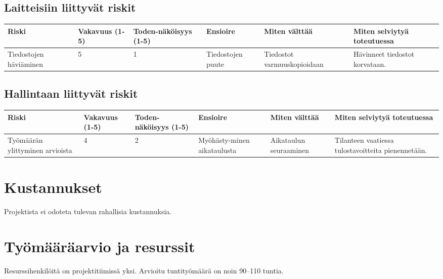 \documentclass[a4paper, 12pt, finnish]{article}
\begin{document}
\subsection{Laitteisiin liittyvät riskit}
\begin{table}[!htpb]
\begin{tabularx}{1.1\textwidth}{|X|X|X|X|X|X|}
\hline
\rowcolor[HTML]{EFEFEF}
\textbf{Riski} & \textbf{Vakavuus (1-5)} & \textbf{Toden-näköisyys (1-5)} & \textbf{Ensioire} & \textbf{Miten välttää} & \textbf{Miten selviytyä toteutuessa} \\ \hline
Tiedostojen häviäminen & 5 & 1 & Tiedostojen puute & Tiedostot varmuuskopioidaan & Hävinneet tiedostot korvataan. \\ \hline
\end{tabularx}
\end{table}

\subsection{Hallintaan liittyvät riskit}
\begin{table}[!htpb]
\begin{tabularx}{1.1\textwidth}{|X|X|X|X|X|X|}
\hline
\rowcolor[HTML]{EFEFEF}
\textbf{Riski} & \textbf{Vakavuus (1-5)} & \textbf{Toden-näköisyys (1-5)} & \textbf{Ensioire} & \textbf{Miten välttää} & \textbf{Miten selviytyä toteutuessa} \\ \hline
Työmäärän ylittyminen arvioista & 4 & 2 & Myöhästy-minen aikataulusta & Aikataulun seuraaminen & Tilanteen vaatiessa tulostavoitteita pienennetään. \\ \hline
\end{tabularx}
\end{table}

\section{Kustannukset}
Projektista ei odoteta tulevan rahallisia kustannuksia.

\section{Työmääräarvio ja resurssit}
Resurssihenkilöitä on projektitiimissä yksi. Arvioitu tuntityömäärä on noin 90–110 tuntia.
\end{document}
